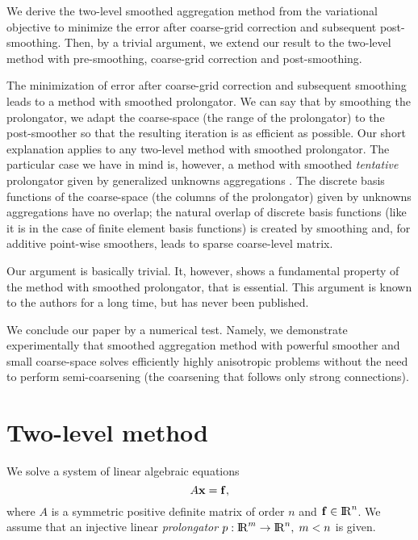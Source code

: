 \documentclass[twoside, 12pt]{article}
\renewcommand{\Re}{{\rm I\negthinspace R}}
\newcommand{\vc}[1]{{\bf #1}} 			%
\newcommand{\eq}[1]{\begin{equation}\label{eq-#1}}
\newcommand{\qe}{\end{equation}}
\begin{document}
We derive the two-level smoothed aggregation
method from the variational objective to minimize the
error after coarse-grid correction and subsequent post-smoothing.
Then, by a trivial argument, we extend our result
to the two-level method
with pre-smoothing, coarse-grid correction and post-smoothing.

The minimization of error after coarse-grid correction
and subsequent smoothing leads to a method with smoothed prolongator.
We can say that by smoothing the prolongator,
we adapt the coarse-space (the range of the
prolongator) to the post-smoother so that the resulting iteration is as
efficient as possible. Our short explanation applies to any two-level method
with smoothed prolongator. The particular case we have in mind is, however, a
method with smoothed {\em tentative} prolongator given by generalized
unknowns aggregations
\cite{amg-theory}. The discrete basis functions of the coarse-space
(the columns of the prolongator) given by
unknowns aggregations have no overlap; the natural
overlap of discrete
basis functions (like it is in the case of
finite element basis functions) is created by smoothing and, for
additive point-wise smoothers, leads to sparse
coarse-level
matrix.

Our argument is basically trivial. It, however, shows a fundamental
property of the method with smoothed prolongator, that is essential.
This argument is known to the authors for a long time,
but has never been published.

We conclude our paper by a numerical test. Namely, we demonstrate
experimentally that smoothed aggregation method with powerful smoother
and small coarse-space solves efficiently highly anisotropic problems
without the need to perform semi-coarsening (the coarsening that follows
only strong connections).


\section{Two-level method}
We solve a system of linear algebraic equations
\eq{A}
       A\vc{x} = \vc{f},
\qe
where $A$ is a symmetric positive definite matrix of order $n$ and
$\vc{f} \in \Re^n$. We assume that an injective linear {\em prolongator}
$p : \Re^m \rightarrow \Re^n,\; m < n$ is given.
\end{document}
